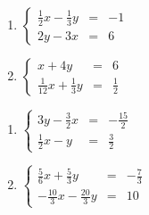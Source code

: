 \documentclass{ximera}
\begin{document}
\begin{multicols}{2}
\begin{enumerate}
\setcounter{enumi}{\value{HW}}

\item  $\left\{ \begin{array}{rcr} \frac{1}{2}x-\frac{1}{3}y & = & -1  \\ [5pt] 2y-3x & = & 6 \end{array} \right.$  


\item $\left\{ \begin{array}{rcr} x+4y & = & 6  \\ [5pt] \frac{1}{12}x+\frac{1}{3}y& = & \frac{1}{2}  \end{array} \right.$ 

\setcounter{HW}{\value{enumi}}
\end{enumerate}
\end{multicols}



\begin{multicols}{2}
\begin{enumerate}
\setcounter{enumi}{\value{HW}}

\item  $\left\{ \begin{array}{rcr} 3y-\frac{3}{2}x & = & -\frac{15}{2}  \\ [5pt] \frac{1}{2}x-y & = & \frac{3}{2} \end{array} \right.$   


\item $\left\{ \begin{array}{rcr} \frac{5}{6}x+\frac{5}{3}y & = & -\frac{7}{3}  \\ [5pt] -\frac{10}{3}x-\frac{20}{3}y & = & 10  \end{array} \right.$ \label{reviewsystemlast} 


\setcounter{HW}{\value{enumi}}
\end{enumerate}
\end{multicols}
\end{document}
